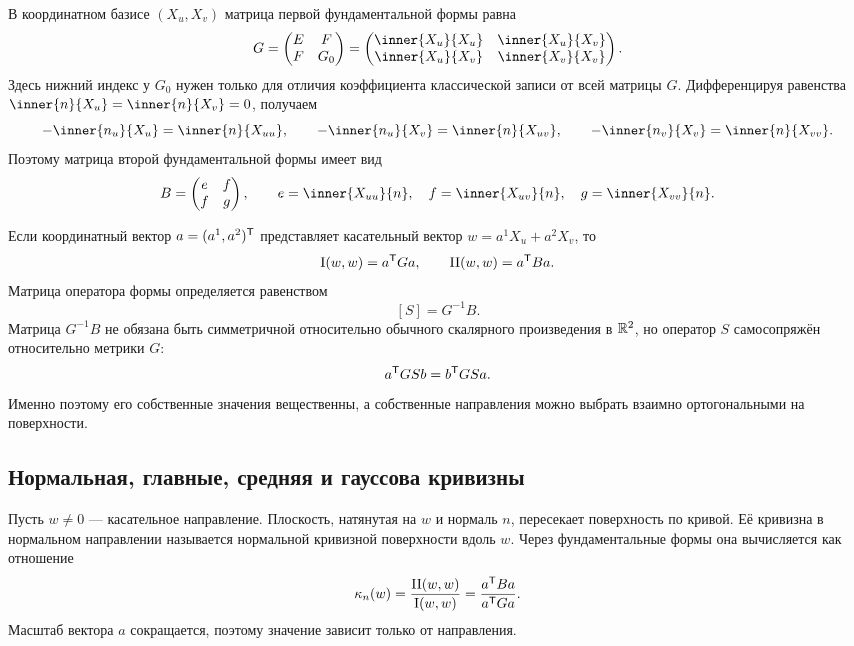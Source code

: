 В координатном базисе \((X_u,X_v)\) матрица первой фундаментальной формы равна
\begin{equation}
\label{eq:v08-first-form-matrix}
G=
\begin{pmatrix}
E&F\\
F&G_0
\end{pmatrix}
=
\begin{pmatrix}
\inner{X_u}{X_u}&\inner{X_u}{X_v}\\
\inner{X_u}{X_v}&\inner{X_v}{X_v}
\end{pmatrix}.
\end{equation}
Здесь нижний индекс у \(G_0\) нужен только для отличия коэффициента классической записи от всей матрицы \(G\). Дифференцируя равенства \(\inner{n}{X_u}=\inner{n}{X_v}=0\), получаем
\[
-\inner{n_u}{X_u}=\inner{n}{X_{uu}},
\qquad
-\inner{n_u}{X_v}=\inner{n}{X_{uv}},
\qquad
-\inner{n_v}{X_v}=\inner{n}{X_{vv}}.
\]
Поэтому матрица второй фундаментальной формы имеет вид
\begin{equation}
\label{eq:second-form-matrix}
B=
\begin{pmatrix}
e&f\\
f&g
\end{pmatrix},
\qquad
e=\inner{X_{uu}}{n},
\quad
f=\inner{X_{uv}}{n},
\quad
g=\inner{X_{vv}}{n}.
\end{equation}

Если координатный вектор \(a=(a^1,a^2)^{\mathsf{T}}\) представляет касательный вектор \(w=a^1X_u+a^2X_v\), то
\[
\mathrm{I}(w,w)=a^{\mathsf{T}}Ga,
\qquad
\mathrm{II}(w,w)=a^{\mathsf{T}}Ba.
\]
Матрица оператора формы определяется равенством
\begin{equation}
\label{eq:shape-matrix-from-forms}
\boxed{[S]=G^{-1}B.}
\end{equation}
Матрица \(G^{-1}B\) не обязана быть симметричной относительно обычного скалярного произведения в \(\mathbb{R}^2\), но оператор \(S\) самосопряжён относительно метрики \(G\):
\[
a^{\mathsf{T}}GSb=b^{\mathsf{T}}GSa.
\]
Именно поэтому его собственные значения вещественны, а собственные направления можно выбрать взаимно ортогональными на поверхности.

\subsection{Нормальная, главные, средняя и гауссова кривизны}

Пусть \(w\neq0\) --- касательное направление. Плоскость, натянутая на \(w\) и нормаль \(n\), пересекает поверхность по кривой. Её кривизна в нормальном направлении называется нормальной кривизной поверхности вдоль \(w\). Через фундаментальные формы она вычисляется как отношение
\begin{equation}
\label{eq:normal-curvature-surface}
\kappa_n(w)
=
\frac{\mathrm{II}(w,w)}{\mathrm{I}(w,w)}
=
\frac{a^{\mathsf{T}}Ba}{a^{\mathsf{T}}Ga}.
\end{equation}
Масштаб вектора \(a\) сокращается, поэтому значение зависит только от направления.


